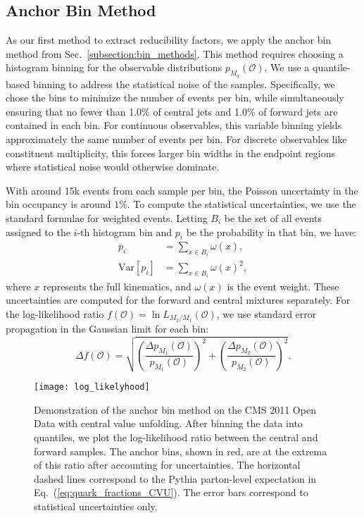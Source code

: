\documentclass[aps,prd,twocolumn,preprintnumbers,nofootinbib,longbibliography,floatfix]{revtex4-1}
\DeclareRobustCommand{\Sec}[1]{Sec.~\ref{#1}}
\DeclareRobustCommand{\Eq}[1]{Eq.~(\ref{#1})}
\newcommand{\figO}{\mathcal{O}}
\newcommand{\Pythia}{{\sc Pythia}\xspace}
\begin{document}


\subsection{Anchor Bin Method}
\label{sec:anchor}

As our first method to extract reducibility factors, we apply the anchor bin method from \Sec{subsection:bin_methods}.
%
This method requires choosing a histogram binning for the observable distributions $p_{M_a}(\figO)$. 
%
We use a quantile-based binning to address the statistical noise of the samples. 
%
Specifically, we chose the bins to minimize the number of events per bin, while simultaneously ensuring that no fewer than 1.0\% of central jets and 1.0\% of forward jets are contained in each bin. 
%
For continuous observables, this variable binning yields approximately the same number of events per bin.
%
For discrete observables like constituent multiplicity, this forces larger bin widths in the endpoint regions where statistical noise would otherwise dominate.



With around 15k events from each sample per bin, the Poisson uncertainty in the bin occupancy is around $1\%$.
%
To compute the statistical uncertainties, we use the standard formulae for weighted events.
%
Letting $B_i$ be the set of all events assigned to the $i$-th histogram bin and $p_i$ be the probability in that bin, we have:
%
\begin{align}
	\label{eq:mean_loglike}
	{\overline{p}}_i &= \sum_{x\in B_i}\omega(x),\\
	\label{eq:err_loglike}
	\text{Var}[p_i] &= \sum_{x\in B_i}{\omega(x)^2},
\end{align}
%
where $x$ represents the full kinematics, and $\omega(x)$ is the event weight.
%
These uncertainties are computed for the forward and central mixtures separately.
%
For the log-likelihood ratio $f(\mathcal{O}) = \ln{L_{M_2/M_1}(\mathcal{O})}$, we use standard error propagation in the Gaussian limit for each bin:
%
\begin{equation}
	\Delta f(\figO) = \sqrt{\left(\frac{\Delta p_{M_1}(\figO)}{p_{M_1}(\figO)}\right)^2+\left(\frac{\Delta p_{M_2}(\figO)}{p_{M_2}(\figO)}\right)^2}.
	\label{eq:delta_f}
\end{equation}

\begin{figure}[t]
	\texttt{[image: log\_likelyhood]}
	\caption{
	Demonstration of the anchor bin method on the CMS 2011 Open Data with central value unfolding.
	After binning the data into quantiles, we plot the log-likelihood ratio between the central and forward samples.
	The anchor bins, shown in red, are at the extrema of this ratio after accounting for uncertainties.
	The horizontal dashed lines correspond to the \Pythia parton-level expectation in \Eq{eq:quark_fractions_CVU}.
	The error bars correspond to statistical uncertainties only.
	}
	\label{fig:loglikelihood_example}
\end{figure}
\end{document}
